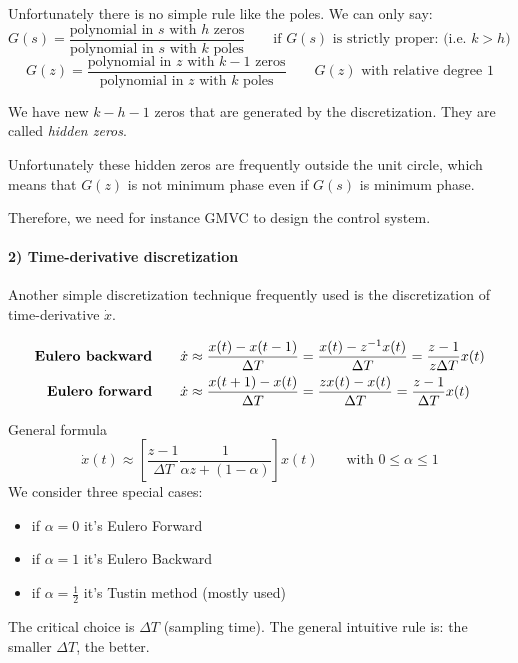 \begin{appendices}
\begin{recall}[$s$-domain]
    Unfortunately there is no simple rule like the poles. We can only say:
    \[
        G(s) = \frac{\text{polynomial in $s$ with $h$ zeros}}{\text{polynomial in $s$ with $k$ poles}} \qquad \text{if $G(s)$ is strictly proper:  (i.e. $k > h$) }
    \]
    \[
        G(z) = \frac{\text{polynomial in $z$ with $k-1$ zeros}}{\text{polynomial in $z$ with $k$ poles}} \qquad \text{$G(z)$ with relative degree 1}
    \]

    We have new $k-h-1$ zeros that are generated by the discretization.
    They are called \emph{hidden zeros}.

    Unfortunately these hidden zeros are frequently outside the unit circle, which means that $G(z)$ is not minimum phase even if $G(s)$ is minimum phase.

    Therefore, we need for instance GMVC to design the control system.
\end{recall}

\paragraph{2) Time-derivative discretization}

Another simple discretization technique frequently used is the discretization of time-derivative $\dot{x}$.

\begin{align*}
    \text{\textbf{Eulero backward}} &\qquad \dot{x} \approx \frac{x(t)-x(t-1)}{\Delta T} = \frac{x(t)-z^{-1}x(t)}{\Delta T} = \frac{z-1}{z\Delta T} x(t) \\
    \text{\textbf{Eulero forward}} &\qquad \dot{x} \approx \frac{x(t+1)-x(t)}{\Delta T} = \frac{zx(t)-x(t)}{\Delta T} = \frac{z-1}{\Delta T} x(t)
\end{align*}

General formula
\[
    \dot{x}(t) \approx \left[ \frac{z-1}{\Delta T} \frac{1}{\alpha z + (1-\alpha)} \right]x(t) \qquad \text{with } 0 \le \alpha \le 1
\]
We consider three special cases:
\begin{itemize}
    \item if $\alpha = 0$ it's Eulero Forward
    \item if $\alpha = 1$ it's Eulero Backward
    \item if $\alpha = \frac{1}{2}$ it's Tustin method (mostly used)
\end{itemize}

The critical choice is $\Delta T$ (sampling time).
The general intuitive rule is: the smaller $\Delta T$, the better.


\end{appendices}
